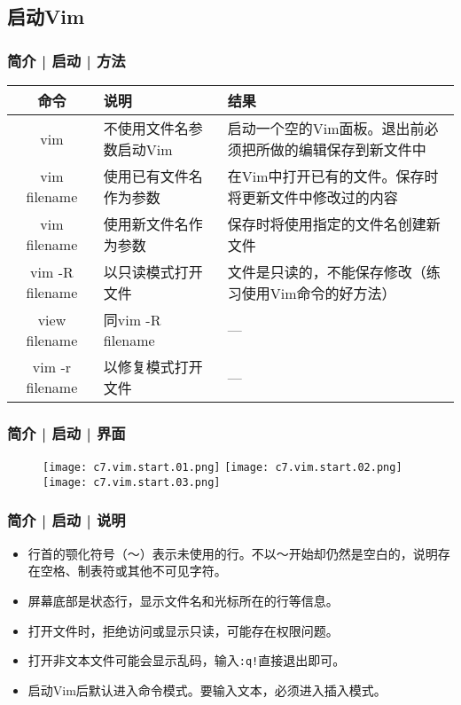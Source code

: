 \subsection{启动Vim}
\begin{frame}
  \frametitle{简介 | 启动 | \alert{方法}}
  \begin{table}
    \centering
    \begin{tabularx}{\textwidth}{cXX}
      \hline
      \rowcolor{blue!50}命令 & 说明 & 结果\\
      \hline
      vim & 不使用文件名参数启动Vim & 启动一个空的Vim面板。退出前必须把所做的编辑保存到新文件中\\
      vim filename & 使用已有文件名作为参数 & 在Vim中打开已有的文件。保存时将更新文件中修改过的内容\\
      vim filename & 使用新文件名作为参数 & 保存时将使用指定的文件名创建新文件\\
      vim -R filename & 以只读模式打开文件 & 文件是只读的，不能保存修改（练习使用Vim命令的好方法）\\
      view filename & 同vim -R filename & ---\\
      vim -r filename & 以修复模式打开文件 & ---\\
      \hline
    \end{tabularx}
  \end{table}
\end{frame}

\begin{frame}
  \frametitle{简介 | 启动 | 界面}
  \begin{figure}
    \centering
    \texttt{[image: c7.vim.start.01.png]}\quad
    \texttt{[image: c7.vim.start.02.png]}\\
    \texttt{[image: c7.vim.start.03.png]}
  \end{figure}
\end{frame}

\begin{frame}[fragile]
  \frametitle{简介 | 启动 | 说明}
  \begin{itemize}[<+->]
    \item 行首的颚化符号（～）表示未使用的行。不以～开始却仍然是空白的，说明存在空格、制表符或其他不可见字符。
    \item 屏幕底部是状态行，显示文件名和光标所在的行等信息。
    \item 打开文件时，拒绝访问或显示只读，可能存在权限问题。
    \item 打开非文本文件可能会显示乱码，输入\verb|:q!|直接退出即可。
    \item 启动Vim后默认进入命令模式。要输入文本，必须进入插入模式。
  \end{itemize}
\end{frame}

